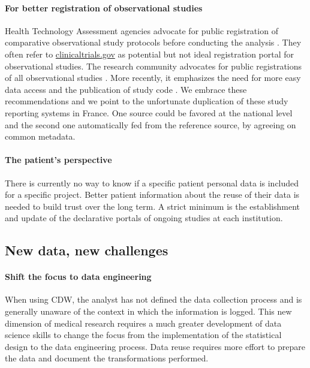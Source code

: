\documentclass[french,12pt,twoside,a4paper]{book}
\begin{document}
\paragraph{For better registration of observational studies} Health Technology
Assessment agencies advocate for public registration of comparative
observational study protocols before conducting the analysis
\citep{berger2017good,fda_real-world_2021,has_real-world_2021}. They often refer
to \url{clinicaltrials.gov} as potential but not ideal registration portal for
observational studies. The research community advocates for public registrations
of all observational studies \citep{rushton2011should,plos2014observational}.
More recently, it emphasizes the need for more easy data access and the
publication of study code
\citep{pavlenko_implementation_2020,kohane_what_2021,nih_2023}. We embrace these
recommendations and we point to the unfortunate duplication of these study
reporting systems in France. One source could be favored at the national level
and the second one automatically fed from the reference source, by agreeing on
common metadata.

\paragraph{The patient's perspective} There is currently no way to know if
a specific patient personal data is included for a specific project. Better patient
information about the reuse of their data is needed to build trust over the long
term. A strict minimum is the establishment and update of the declarative
portals of ongoing studies at each institution.

\subsection{New data, new challenges}%
\label{subsec:cdw:recommendations:data}%

\paragraph{Shift the focus to data engineering} When using CDW, the analyst has not defined the data collection process and is
generally unaware of the context in which the information is logged. This new
dimension of medical research requires a much greater development of data
science skills to change the focus from the implementation of the statistical
design to the data engineering process. Data reuse requires more effort to
prepare the data and document the transformations performed.
\end{document}
